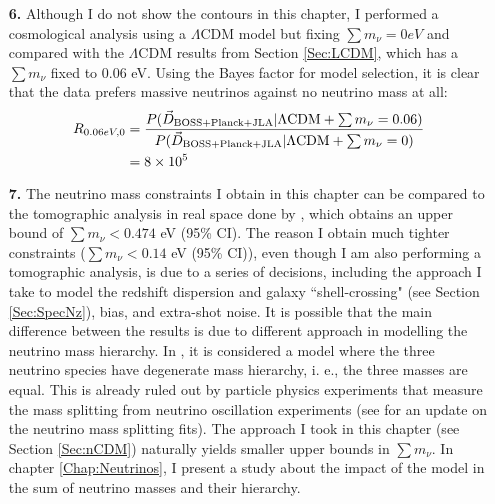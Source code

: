 \begin{itemize}
\item[\textbf{6.}] Although I do not show the contours in this chapter, I performed a cosmological analysis using a $\Lambda$CDM model but fixing $\sum m_{\nu} = 0 eV$ and compared with the $\Lambda$CDM results from Section \ref{Sec:LCDM}, which has a $\sum m_{\nu}$ fixed to $0.06$ eV. Using the Bayes factor for model selection, it is clear that the data prefers massive neutrinos against no neutrino mass at all:
\begin{align}
R_{0.06 eV, 0} & = \frac{P(\vec{D}_{\tiny\text{BOSS+Planck+JLA}}| \Lambda\text{CDM} + \sum m_{\nu} = 0.06)}{P(\vec{D}_{\tiny\text{BOSS+Planck+JLA}}| \Lambda\text{CDM} + \sum m_{\nu} = 0)} \nonumber \\
& = 8 \times 10^5 \nonumber
\end{align}

\item[\textbf{7.}] The neutrino mass constraints I obtain in this chapter can be compared to the tomographic analysis in real space done by \cite{2017SalazarBOSSwTheta}, which obtains an upper bound of $\sum m_{\nu} < 0.474$ eV (95\% CI). The reason I obtain much tighter constraints ($\sum m_{\nu} < 0.14$ eV (95\% CI)), even though I am also performing a tomographic analysis, is due to a series of decisions, including the approach I take to model the redshift dispersion and galaxy ``shell-crossing" (see Section \ref{Sec:SpecNz}), bias, and extra-shot noise. It is possible that the main difference between the results is due to different approach in modelling the neutrino mass hierarchy. In \cite{2017SalazarBOSSwTheta}, it is considered a model where the three neutrino species have degenerate mass hierarchy, i. e., the three masses are equal. This is already ruled out by particle physics experiments that measure the mass splitting from neutrino oscillation experiments (see \citealt{2014Gonzalez-GarciaNeutrino} for an update on the neutrino mass splitting fits). The approach I took in this chapter (see Section \ref{Sec:nCDM}) naturally yields smaller upper bounds in $\sum m_{\nu}$. In chapter \ref{Chap:Neutrinos}, I present a study about the impact of the model in the sum of neutrino masses and their hierarchy.

\end{itemize}


